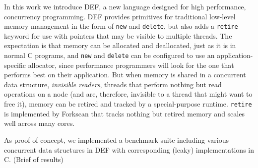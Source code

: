In this work we introduce DEF, a new language designed for high performance, concurrency programming.  DEF provides primitives for traditional low-level memory management in the form of \texttt{new} and \texttt{delete}, but also adds a \texttt{retire} keyword for use with pointers that may be visible to multiple threads.  The expectation is that memory can be allocated and deallocated, just as it is in normal C programs, and \texttt{new} and \texttt{delete} can be configured to use an application-specific allocator, since performance programmers will look for the one that performs best on their application.  But when memory is shared in a concurrent data structure, \textit{invisible readers}, threads that perform nothing but read operations on a node (and are, therefore, invisible to a thread that might want to free it), memory can be retired and tracked by a special-purpose runtime.  \texttt{retire} is implemented by Forkscan that tracks nothing but retired memory and scales well across many cores.\cite{Forkscan}

As proof of concept, we implemented a benchmark suite including various concurrent data structures in DEF with corresponding (leaky) implementations in C. (Brief of results)

